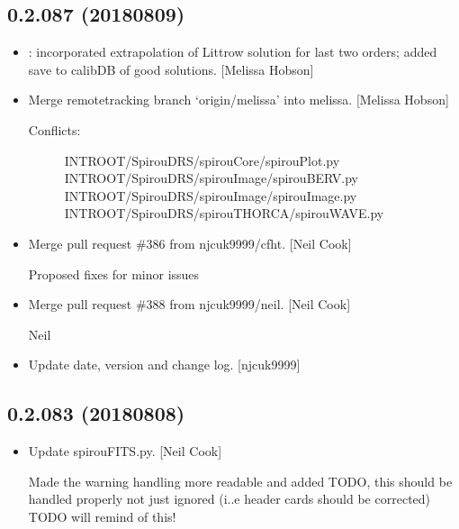 \documentclass[a4paper,10pt,english]{report}
\begin{document}
\subsection{0.2.087 (2018\sphinxhyphen{}08\sphinxhyphen{}09)}
\label{\detokenize{misc/changelog:id394}}\begin{itemize}
\item {} 
: incorporated extrapolation of Littrow
solution for last two orders; added save to calibDB of good solutions.
{[}Melissa Hobson{]}

\item {} 
Merge remote\sphinxhyphen{}tracking branch ‘origin/melissa’ into melissa. {[}Melissa
Hobson{]}
\begin{description}
\item[{Conflicts:}] \leavevmode
INTROOT/SpirouDRS/spirouCore/spirouPlot.py
INTROOT/SpirouDRS/spirouImage/spirouBERV.py
INTROOT/SpirouDRS/spirouImage/spirouImage.py
INTROOT/SpirouDRS/spirouTHORCA/spirouWAVE.py

\end{description}

\item {} 
Merge pull request \#386 from njcuk9999/cfht. {[}Neil Cook{]}

Proposed fixes for minor issues

\item {} 
Merge pull request \#388 from njcuk9999/neil. {[}Neil Cook{]}

Neil

\item {} 
Update date, version and change log. {[}njcuk9999{]}

\end{itemize}


\subsection{0.2.083 (2018\sphinxhyphen{}08\sphinxhyphen{}08)}
\label{\detokenize{misc/changelog:id395}}\begin{itemize}
\item {} 
Update spirouFITS.py. {[}Neil Cook{]}

Made the warning handling more readable and added TODO, this should be handled properly not just ignored (i..e header cards should be corrected) \sphinxhyphen{} TODO will remind of this!

\end{itemize}
\end{document}
